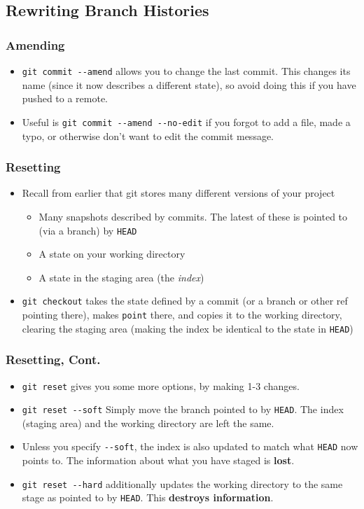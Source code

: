 \subsection{Rewriting Branch Histories}

\begin{frame}[fragile]
\frametitle{Amending}
\begin{itemize}
\item \lstinline{git commit --amend} allows you to change the last commit. This changes its name (since it now describes a different state), so avoid doing this if you have pushed to a remote.
\item Useful is \lstinline{git commit --amend --no-edit} if you forgot to add a file, made a typo, or otherwise don't want to edit the commit message.
\end{itemize}
\end{frame}

\begin{frame}[fragile]
\frametitle{Resetting}
\begin{itemize}
\item Recall from earlier that git stores many different versions of your project
\begin{itemize}
\item Many snapshots described by commits. The latest of these is pointed to (via a branch) by \texttt{HEAD}
\item A state on your working directory
\item A state in the staging area (the \emph{index})
\end{itemize}
\item \lstinline{git checkout} takes the state defined by a commit (or a branch or other ref pointing there), makes \lstinline{point} there, and copies it to the working directory, clearing the staging area (making the index be identical to the state in \lstinline{HEAD})
\end{itemize}
\end{frame}

\begin{frame}[fragile]
\frametitle{Resetting, Cont.}
\begin{itemize}
\item \lstinline{git reset} gives you some more options, by making 1-3 changes.
\item \lstinline{git reset --soft} Simply move the branch pointed to by \lstinline{HEAD}. The index (staging area) and the working directory are left the same.
\item Unless you specify \lstinline{--soft}, the index is also updated to match what \lstinline{HEAD} now points to. The information about what you have staged is \textbf{lost}.
\item \lstinline{git reset --hard} additionally updates the working directory to the same stage as pointed to by \lstinline{HEAD}. This \textbf{destroys information}.
\end{itemize}
\end{frame}

